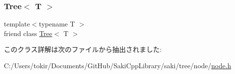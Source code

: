 \subsubsection{\texorpdfstring{Tree$<$ T $>$}{Tree< T >}}
{\footnotesize\ttfamily template$<$typename T $>$ \\
friend class \mbox{\hyperlink{classsaki_1_1_tree}{Tree}}$<$ T $>$\hspace{0.3cm}{\ttfamily [friend]}}



このクラス詳解は次のファイルから抽出されました\+:\begin{DoxyCompactItemize}
\item 
C\+:/\+Users/tokir/\+Documents/\+Git\+Hub/\+Saki\+Cpp\+Library/saki/tree/node/\mbox{\hyperlink{node_8h}{node.\+h}}\end{DoxyCompactItemize}
